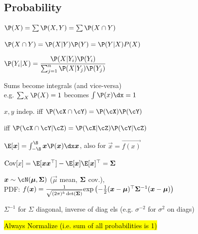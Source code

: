 \subsection{Probability}
 $\P(X) = \sum \P(X, Y) = \sum \P(X \cap Y)$

\shortdefinition[Prod] $\P(X \cap Y) = \P(X | Y) \P(Y) = \P(Y | X) P(X)$

\shorttheorem[Bayes] $\displaystyle \P(Y_i | X) = \frac{\P(X | Y_i) \P(Y_i)}{\sum_{j = 1}^n \P(X | Y_j) \P(Y_j)}$

 Sums become integrals (and vice-versa)\\
e.g. $\sum_{X} \P(X) = 1$ becomes $\int \P(x) \dx = 1$

\shortdefinition[Indep.] $x, y$ indep. iff $\P(\cX \cap \cY) = \P(\cX) \P(\cY)$

 iff $\P(\cX \cap \cY | \cZ) = \P(\cX | \cZ) \P(\cY | \cZ)$

\shortdefinition $\E[\vec{x}] = \int_{-\8}^{\8} \vec{x} \P(\vec{x}) \dx \vec{x}$, also for $\vec{x} = \vec{f(x)}$

\shortdefinition $\text{Cov}[x] = \E[\vec{x} \vec{x}^\top] - \E[\vec{x}]\E[\vec{x}]^\top = \mat{\Sigma}$

 $\vec{x} \sim \cN(\vec{\mu}, \mat{\Sigma})$ ($\vec{\mu}$ mean, $\bm{\Sigma}$ cov.),\\
PDF: $f(\bm{x}) = \frac{1}{\sqrt{(2\pi)^k \det(\bm{\Sigma})}} \text{exp}\left( -\frac{1}{2}(\bm{x} - \bm{\mu})^\top \bm{\Sigma}^{-1} (\bm{x} - \bm{\mu}) \right)$

$\Sigma^{-1}$ for $\Sigma$ diagonal, inverse of diag els (e.g. $\sigma^{-2}$ for $\sigma^2$ on diags)

\hl{Always Normalize (i.e. sum of all probabilities is 1)}
